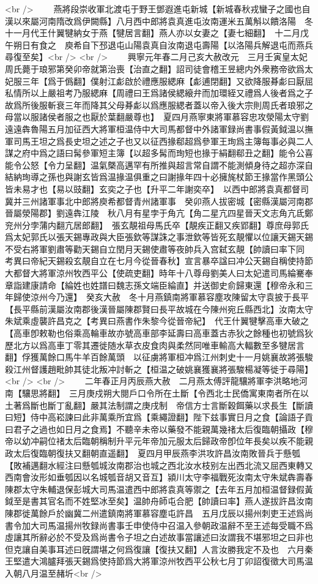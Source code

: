 <br />
　　燕將段崇收軍北渡屯于野王鄧遐進屯新城【新城春秋戎蠻子之國也自漢以來屬河南隋改爲伊闕縣】八月西中郎將袁真進屯汝南運米五萬斛以饋洛陽　冬十一月代王什翼犍納女于燕【犍居言翻】燕人亦以女妻之【妻七細翻】　十二月戊午朔日有食之　庾希自下邳退屯山陽袁真自汝南退屯壽陽【以洛陽兵解退屯而燕兵尋復至矣】<br />
<br />
　　興寧元年春二月己亥大赦改元　三月壬寅皇太妃周氏薨于琅邪第癸卯帝就第治喪【治直之翻】詔司徒會稽王昱總内外衆務帝欲爲太妃服三年【爲于僞翻】僕射江虨啟於禮應服緦麻【虨逋閉翻】又欲降服朞虨曰厭屈私情所以上嚴祖考乃服緦麻【周禮曰王爲諸侯緦縗弁而加環絰又禮爲人後者爲之子故爲所後服斬衰三年而降其父母朞虨以爲應服緦者蓋以帝入後大宗則周氏者琅邪之母當以服諸侯者服之也厭於葉翻嚴尊也】　夏四月燕寧東將軍慕容忠攻滎陽太守劉遠遠犇魯陽五月加征西大將軍桓温侍中大司馬都督中外諸軍録尚書事假黃鉞温以撫軍司馬王坦之爲長史坦之述之子也又以征西掾郗超爲參軍王珣爲主簿每事必與二人謀之府中爲之語曰髯參軍短主簿【以超多髯而珣短也掾于絹翻郗丑之翻】能令公喜能令公怒【令力呈翻】温氣槩高邁罕有所推與超言常自謂不能測傾身待之超亦深自結納珣導之孫也與謝玄皆爲温掾温俱重之曰謝掾年四十必擁旄杖節王掾當作黑頭公皆未易才也【易以豉翻】玄奕之子也【升平二年謝奕卒】　以西中郎將袁真都督司冀并三州諸軍事北中郎將庾希都督青州諸軍事　癸卯燕人拔密城【密縣漢屬河南郡晉屬滎陽郡】劉遠犇江陵　秋八月有星孛于角亢【角二星亢四星晉天文志角亢氐鄭兖州分孛蒲内翻亢居郎翻】　張玄靚祖母馬氏卒【靚疾正翻又疾郢翻】尊庶母郭氏爲太妃郭氏以張天錫專政與大臣張欽等謀誅之事泄欽等皆死玄靚懼以位讓天錫天錫不受右將軍劉肅等勸天錫自立閏月天錫使肅等夜帥兵入宫弑玄靚【帥讀曰率下同　考異曰帝紀天錫殺玄靚自立在七月今從晉春秋】宣言暴卒諡曰冲公天錫自稱使持節大都督大將軍涼州牧西平公【使疏吏翻】時年十八尊母劉美人曰太妃遣司馬綸騫奉章詣建康請命【綸姓也姓譜曰魏志孫文端臣綸直】并送御史俞歸東還【穆帝永和三年歸使涼州今乃還】　癸亥大赦　冬十月燕鎮南將軍慕容塵攻陳留太守袁披于長平【長平縣前漢屬汝南郡後漢晉屬陳郡賢曰長平故城在今陳州宛丘縣西北】汝南太守朱斌乘虛襲許昌克之【考異曰燕書作朱黎今從晉帝紀】　代王什翼犍擊高車大破之【高車卽敕勒也俗乘高輪車故亦號高車部李延壽曰高車蓋古赤狄之餘種也初號爲狄歷北方以爲高車丁零其遷徙随水草衣皮食肉與柔然同唯車輸高大輻數至多犍居言翻】俘獲萬餘口馬牛羊百餘萬頭　以征虜將軍桓冲爲江州刺史十一月姚襄故將張駿殺江州督護趙毗帥其徒北叛冲討斬之【桓温之破姚襄獲襄將張駿楊凝等徙于尋陽】<br />
<br />
　　二年春正月丙辰燕大赦　二月燕太傅評龍驤將軍李洪略地河南【驤思將翻】　三月庚戍朔大閱戶口令所在土斷【令西北士民僑寓東南者所在以土著爲斷也斷丁亂翻】嚴其法制謂之庚戌制　帝信方士言斷穀餌藥以求長生【斷讀曰短】侍中高崧諫曰此非萬乘所宜爲【乘繩證翻】陛下兹事實日月之食【論語子貢曰君子之過也如日月之食焉】不聽辛未帝以藥發不能親萬幾禇太后復臨朝攝政【穆帝以幼冲嗣位禇太后臨朝稱制升平元年帝加元服太后歸政帝卽位年長矣以疾不能親政太后復臨朝復扶又翻朝直遥翻】　夏四月甲辰燕李洪攻許昌汝南敗晉兵于懸瓠【敗補邁翻水經注曰懸瓠城汝南郡治也城之西北汝水枝别左出西北流又屈西東轉又西南會汝形如垂瓠因以名城瓠音胡又音互】潁川太守李福戰死汝南太守朱斌犇壽春陳郡太守朱輔退保彭城大司馬温遣西中郎將袁真等禦之【去年五月加桓温督録假黃鉞至是書其官名而不姓堅冰至矣】温帥舟師屯合肥【帥讀曰率】燕人遂拔許昌汝南陳郡徙萬餘戶於幽冀二州遣鎮南將軍慕容塵屯許昌　五月戊辰以揚州刺吏王述爲尚書令加大司馬温揚州牧録尚書事壬申使侍中召温入參朝政温辭不至王述每受職不爲虛讓其所辭必於不受及爲尚書令子坦之白述故事當讓述曰汝謂我不堪邪坦之曰非也但克讓自美事耳述曰旣謂堪之何爲復讓【復扶又翻】人言汝勝我定不及也　六月秦王堅遣大鴻臚拜張天錫爲使持節爲大將軍涼州牧西平公秋七月丁卯詔復徵大司馬温入朝八月温至赭圻<br />
